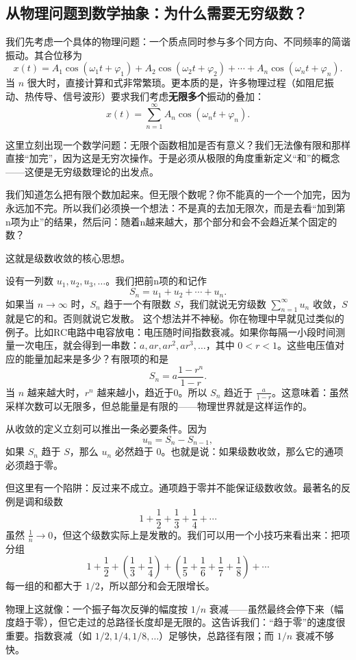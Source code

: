 \documentclass[UTF8]{ctexbook}
\begin{document}
\subsection{从物理问题到数学抽象：为什么需要无穷级数？}

我们先考虑一个具体的物理问题：一个质点同时参与多个同方向、不同频率的简谐振动。其合位移为
\[
x(t) = A_1 \cos(\omega_1 t + \varphi_1) + A_2 \cos(\omega_2 t + \varphi_2) + \cdots + A_n \cos(\omega_n t + \varphi_n).
\]
当 $n$ 很大时，直接计算和式非常繁琐。更本质的是，许多物理过程（如阻尼振动、热传导、信号波形）要求我们考虑\textbf{无限多个}振动的叠加：
\[
x(t) = \sum_{n=1}^{\infty} A_n \cos(\omega_n t + \varphi_n).
\]

这里立刻出现一个数学问题：无限个函数相加是否有意义？我们无法像有限和那样直接“加完”，因为这是无穷次操作。于是必须从极限的角度重新定义“和”的概念——这便是无穷级数理论的出发点。

我们知道怎么把有限个数加起来。但无限个数呢？你不能真的一个一个加完，因为永远加不完。所以我们必须换一个想法：不是真的去加无限次，而是去看“加到第n项为止”的结果，然后问：随着n越来越大，那个部分和会不会趋近某个固定的数？

这就是级数收敛的核心思想。

设有一列数 $u_1, u_2, u_3, \dots$。我们把前n项的和记作
\[
S_n = u_1 + u_2 + \cdots + u_n.
\]
如果当 $n \to \infty$ 时，$S_n$ 趋于一个有限数 $S$，我们就说无穷级数 $\sum_{n=1}^{\infty} u_n$ 收敛，$S$ 就是它的和。否则就说它发散。
这个想法并不神秘。你在物理中早就见过类似的例子。比如RC电路中电容放电：电压随时间指数衰减。如果你每隔一小段时间测量一次电压，就会得到一串数：$a, ar, ar^2, ar^3, \dots$，其中 $0<r<1$。这些电压值对应的能量加起来是多少？有限项的和是
\[
S_n = a\frac{1-r^{n}}{1-r}.
\]
当 $n$ 越来越大时，$r^n$ 越来越小，趋近于0。所以 $S_n$ 趋近于 $\frac{a}{1-r}$。这意味着：虽然采样次数可以无限多，但总能量是有限的——物理世界就是这样运作的。


从收敛的定义立刻可以推出一条必要条件。因为
\[
u_n = S_n - S_{n-1},
\]
如果 $S_n$ 趋于 $S$，那么 $u_n$ 必然趋于 $0$。也就是说：如果级数收敛，那么它的通项必须趋于零。

但这里有一个陷阱：反过来不成立。通项趋于零并不能保证级数收敛。最著名的反例是调和级数
\[
1 + \frac12 + \frac13 + \frac14 + \cdots
\]
虽然 $\frac1n \to 0$，但这个级数实际上是发散的。我们可以用一个小技巧来看出来：把项分组
\[
1 + \frac12 + \left(\frac13+\frac14\right) + \left(\frac15+\frac16+\frac17+\frac18\right) + \cdots
\]
每一组的和都大于 $1/2$，所以部分和会无限增长。

物理上这就像：一个振子每次反弹的幅度按 $1/n$ 衰减——虽然最终会停下来（幅度趋于零），但它走过的总路径长度却是无限的。这告诉我们：“趋于零”的速度很重要。指数衰减（如 $1/2, 1/4, 1/8, \dots$）足够快，总路径有限；而 $1/n$ 衰减不够快。
\end{document}
